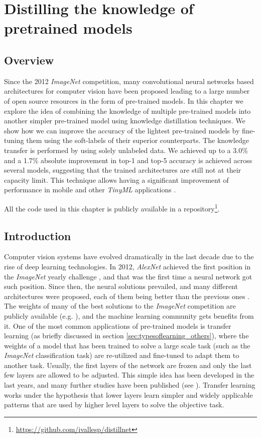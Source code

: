\chapter{Distilling the knowledge of pretrained models} \label{ch:distillation}
\section{Overview}
Since the 2012 \textit{ImageNet} competition, many convolutional neural networks based architectures for computer vision have been proposed leading to a large number of open source resources in the form of pre-trained models. In this chapter we explore the idea of combining the knowledge of multiple pre-trained models into another simpler pre-trained model using knowledge distillation techniques. We show how we can improve the accuracy of the lightest pre-trained models by fine-tuning them using the soft-labels of their superior counterparts. The knowledge transfer is performed by using solely unlabeled data. We achieved up to a 3.0\% and a 1.7\% absolute improvement in top-1 and top-5 accuracy is achieved across several models, suggesting that the trained architectures are still not at their capacity limit. This technique allows having a significant improvement of performance in mobile and other \textit{TinyML} applications \autocite{sanchez2020}.

 All the code used in this chapter is publicly available in a repository\footnote{\url{https://github.com/ivallesp/distillnet}}.

\section{Introduction}
Computer vision systems have evolved dramatically in the last decade due to the rise of deep learning technologies. In 2012, \textit{AlexNet} \autocite{krizhevsky2012} achieved the first position in the \textit{ImageNet} yearly challenge \autocite{ILSVRC15}, and that was the first time a neural network got such position. Since then, the neural solutions prevailed, and many different architectures were proposed, each of them being better than the previous ones \autocite{khan2020, algan2021}. The weights of many of the best solutions to the \textit{ImageNet} competition are publicly available (e.g. \autocite{he2016, chollet2017, szegedy2016, szegedy2017, howard2017, pham2018, tan2019}), and the machine learning community gets benefits from it. One of the most common applications of pre-trained models is transfer learning \autocite{huang2021} (as briefly discussed in section \ref{sec:typesoflearning_others}), where the weights of a model that has been trained to solve a large scale task (such as the \textit{ImageNet} classification task) are re-utilized and fine-tuned to adapt them to another task. Usually, the first layers of the network are frozen and only the last few layers are allowed to be adjusted. This simple idea has been developed in the last years, and many further studies have been published (see \autocite{zhu2018, wu2021, pzhao2021}). Transfer learning works under the hypothesis that lower layers learn simpler and widely applicable patterns that are used by higher level layers to solve the objective task.

